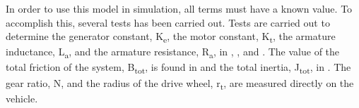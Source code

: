 %
In order to use this model in simulation, all terms must have a known value. To accomplish this, several tests has been carried out. Tests are carried out to determine the generator constant, \si{K_e}, the motor constant, \si{K_t}, the armature inductance, \si{L_a}, and the armature resistance, \si{R_a}, in , ,  and . The value of the total friction of the system, \si{B_{tot}}, is found in  and the total inertia, \si{J_{tot}}, in . The gear ratio, \si{N}, and the radius of the drive wheel, \si{r_t}, are measured directly on the vehicle.